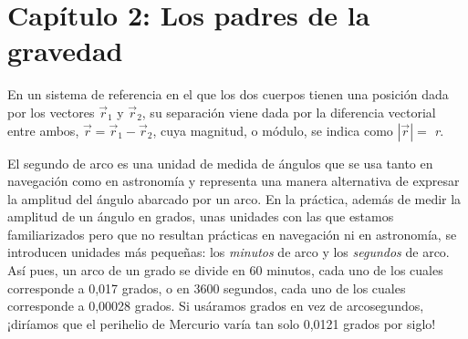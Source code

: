 \section*{Capítulo 2: Los padres de la gravedad}
\begin{description}[style=multiline,leftmargin=2em,labelwidth=1.5em]

\item[1.]\hypertarget{note:02-01}{}En un sistema de referencia en el que los dos
cuerpos tienen una posición dada por los vectores
\({\overrightarrow{r}}_{1}\) y \({\overrightarrow{r}}_{2}\), su separación viene
dada por la diferencia vectorial entre ambos,
\({\overrightarrow{r} = \overrightarrow{r}}_{1} - {\overrightarrow{r}}_{2}\),
cuya magnitud, o módulo, se indica como
\(\left| \overrightarrow{r} \right| =\) \emph{r}.

\item[2.]\hypertarget{note:02-02}{}El segundo de arco es una unidad de medida de
ángulos que se usa tanto en navegación como en astronomía y representa una manera
alternativa de expresar la amplitud del ángulo abarcado por un arco. En la práctica,
además de medir la amplitud de un ángulo en grados, unas unidades con las que
estamos familiarizados pero que no resultan prácticas en navegación ni en
astronomía, se introducen unidades más pequeñas: los \emph{minutos} de arco y
los \emph{segundos} de arco. Así pues, un arco de un grado se divide en
60 minutos, cada uno de los cuales corresponde a 0,017 grados, o en 3600 segundos,
cada uno de los cuales corresponde a 0,00028 grados. Si usáramos grados en vez
de arcosegundos, ¡diríamos que el perihelio de Mercurio varía
tan solo 0,0121 grados por siglo!

\end{description}
